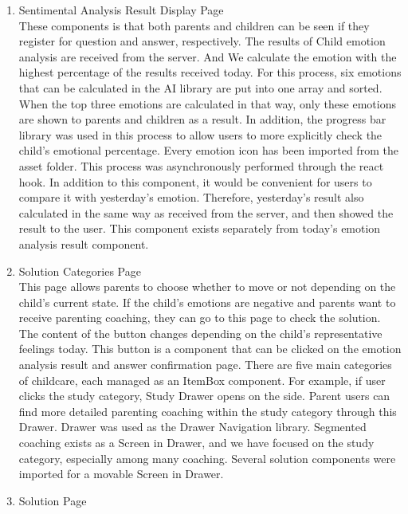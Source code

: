 \documentclass[conference]{IEEEtran}
\begin{document}
\begin{enumerate}
\begin{enumerate}
\begin{enumerate}
               \newline
               \item Sentimental Analysis Result Display Page
               \\These components is that both parents and children can be seen if they register for question and answer, respectively. The results of Child emotion analysis are received from the server. And We calculate the emotion with the highest percentage of the results received today. For this process, six emotions that can be calculated in the AI library are put into one array and sorted. When the top three emotions are calculated in that way, only these emotions are shown to parents and children as a result. In addition, the progress bar library was used in this process to allow users to more explicitly check the child's emotional percentage. Every emotion icon has been imported from the asset folder. This process was asynchronously performed through the react hook. In addition to this component, it would be convenient for users to compare it with yesterday's emotion. Therefore, yesterday's result also calculated in the same way as received from the server, and then showed the result to the user. This component exists separately from today's emotion analysis result component.
               \newline
               \item Solution Categories Page
               \\This page allows parents to choose whether to move or not depending on the child's current state. If the child's emotions are negative and parents want to receive parenting coaching, they can go to this page to check the solution. The content of the button changes depending on the child's representative feelings today. This button is a component that can be clicked on the emotion analysis result and answer confirmation page. There are five main categories of childcare, each managed as an ItemBox component. For example, if user clicks the study category, Study Drawer opens on the side. Parent users can find more detailed parenting coaching within the study category through this Drawer. Drawer was used as the Drawer Navigation library. Segmented coaching exists as a Screen in Drawer, and we have focused on the study category, especially among many coaching. Several solution components were imported for a movable Screen in Drawer.
               \newline
               \item Solution Page

\end{enumerate}
\end{enumerate}
\end{enumerate}
\end{document}
